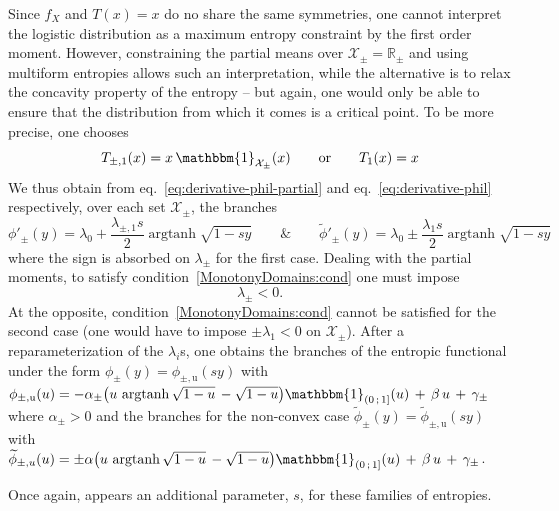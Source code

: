 \documentclass[entropy,article,submit,moreauthors,pdftex]{Definitions/mdpi}
\def\Rset{\mathbb{R}}%
\def\X{\mathcal{X}}%
\def\un{\mathbbm{1}}%
\def\argtanh{\operatorname{argtanh}}%
\def\u{\mathrm{u}}
\begin{document}
Since $f_X$ and $T(x) = x$ do no share the same symmetries, one cannot interpret
the logistic  distribution as a  maximum entropy  constraint by the  first order
moment. However,  constraining the partial  means over $\X_\pm =  \Rset_\pm$ and
using multiform entropies  allows such an interpretation,  while the alternative
is to relax the  concavity property of the entropy -- but  again, one would only
be able to ensure that the distribution from which it comes is a critical point.
To be more precise, one chooses
%
\[
T_{\pm,1}(x) = x \, \un_{\X_\pm}(x) \qquad \mbox{or} \qquad T_1(x) = x
\]
%
We     thus    obtain     from    eq.~\eqref{eq:derivative-phil-partial}     and
eq.~\eqref{eq:derivative-phil}  respectively,   over  each  set   $\X_\pm$,  the
branches
%
\[
\phi'_\pm(y)  =  \lambda_0  +  \frac{\lambda_{\pm,1}  s}{2}  \argtanh\sqrt{1-sy}
\qquad \mbox{\&} \qquad \widetilde{\phi}'_\pm(y) = \lambda_0 \pm \frac{\lambda_1
  s}{2} \argtanh\sqrt{1-sy}
\]
%
where the sign is absorbed on $\lambda_\pm$ for the first case. Dealing with the
partial  moments,  to   satisfy  condition~\ref{MonotonyDomains:cond}  one  must
impose       $$\lambda_\pm       <       0.$$       At       the       opposite,
condition~\ref{MonotonyDomains:cond}  cannot be  satisfied for  the second  case
(one  would  have  to  impose  $\pm  \lambda_1  <  0$  on  $\X_\pm$).   After  a
reparameterization of the $\lambda_i$s, one obtains the branches of the entropic
functional   under   the   form   $\phi_\pm(y)  =   \phi_{\pm,\u}(s   y)$   with
$\phi_{\pm,\u}(u) = - \alpha_\pm \left(  u \, \argtanh\sqrt{1-u} \, - \sqrt{1-u}
\right)  \un_{\left( 0  \,  ; \,  1 \right]}(u)  \,  + \,  \beta  \, u  \, +  \,
  \gamma_\pm$ where  $\alpha_\pm > 0$ and  the branches for the  non-convex case
  $\widetilde{\phi}_\pm(y)    =   \widetilde{\phi}_{\pm,\u}(s    y)$   with    $
  \widetilde{\phi}_{\pm,u}(u) = \pm  \alpha \left( u \,  \argtanh\sqrt{1-u} \, -
  \sqrt{1-u} \right) \un_{\left( 0 \, ; \, 1 \right]}(u) \, + \, \beta \, u \, +
    \, \gamma_\pm$.

Once  again,  appears  an  additional  parameter, $s$,  for  these  families  of
entropies.
\end{document}

